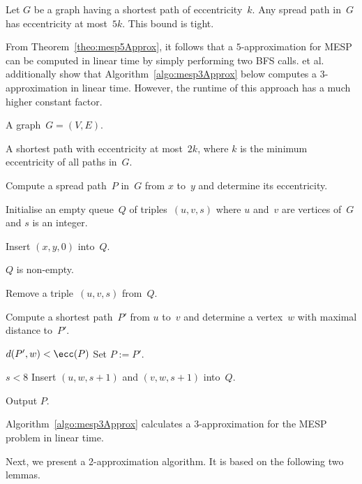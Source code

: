 \begin{theorem}
    \label{theo:mesp5Approx}
Let \( G \) be a graph having a shortest path of eccentricity~\( k \).
Any spread path in~\( G \) has eccentricity at most~\( 5k \).
This bound is tight.
\end{theorem}

From Theorem~\ref{theo:mesp5Approx}, it follows that a $5$-approximation for MESP can be computed in linear time by simply performing two BFS calls.
 et al.\,\cite{BirmDeMoPlan2016} additionally show that Algorithm~\ref{algo:mesp3Approx} below computes a $3$-approximation in linear time.
However, the runtime of this approach has a much higher constant factor.

\begin{algorithm}
    [htb]
    \caption
    {%
        \cite{BirmDeMoPlan2016}
        Computes a $3$-approximation for MESP.
    }
    \label{algo:mesp3Approx}
%
\KwIn
{%
    A graph~$G = (V, E)$.
}

\KwOut
{%
    A shortest path with eccentricity at most~$2k$, where $k$ is the minimum eccentricity of all paths in~$G$.
}

Compute a spread path~$P$ in~$G$ from $x$ to~$y$ and determine its eccentricity.

Initialise an empty queue~$Q$ of triples~$(u, v, s)$ where $u$ and~$v$ are vertices of~$G$ and $s$ is an integer.

Insert $(x, y, 0)$ into~$Q$.

\While
{%
    $Q$ is non-empty.
}
{%
    Remove a triple~$(u, v, s)$ from~$Q$.

    Compute a shortest path~$P'$ from $u$ to~$v$ and determine a vertex~$w$ with maximal distance to~$P'$.

    \If
    {%
        $d(P', w) < \ecc(P)$
    }
    {%
        Set $P := P'$.
    }

    \If
    {%
        $s < 8$
    }
    {%
        Insert $(u, w, s + 1)$ and $(v, w, s + 1)$ into~$Q$.
    }
}

Output $P$.
\end{algorithm}

\begin{theorem}
Algorithm~\ref{algo:mesp3Approx} calculates a \( 3 \)-approximation for the MESP problem in linear time.
\end{theorem}

Next, we present a 2-approximation algorithm.
It is based on the following two lemmas.

